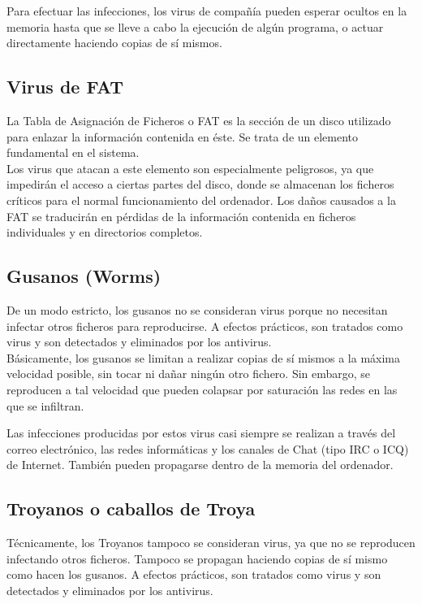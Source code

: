 \documentclass[12pt,a4paper]{article}
\begin{document}
	Para efectuar las infecciones, los virus de compañía pueden esperar ocultos en la memoria hasta que se lleve a cabo la ejecución de algún programa, o actuar directamente haciendo copias de sí mismos.
	
	\subsection{Virus de FAT}
	La Tabla de Asignación de Ficheros o FAT es la sección de un disco utilizado para enlazar la información contenida en éste. Se trata de un elemento fundamental en el sistema.\\
	
	Los virus que atacan a este elemento son especialmente peligrosos, ya que impedirán el acceso a ciertas partes del disco, donde se almacenan los ficheros críticos para el normal funcionamiento del ordenador. Los daños causados a la FAT se traducirán en pérdidas de la información contenida en ficheros individuales y en directorios completos.
	
	\subsection{Gusanos (Worms)}
	De un modo estricto, los gusanos no se consideran virus porque no necesitan infectar otros ficheros para reproducirse. A efectos prácticos, son tratados como virus y son detectados y eliminados por los antivirus.\\
	
	Básicamente, los gusanos se limitan a realizar copias de sí mismos a la máxima velocidad posible, sin tocar ni dañar ningún otro fichero. Sin embargo, se reproducen a tal velocidad que pueden colapsar por saturación las redes en las que se infiltran.
	
	Las infecciones producidas por estos virus casi siempre se realizan a través del correo electrónico, las redes informáticas y los canales de Chat (tipo IRC o ICQ) de Internet. También pueden propagarse dentro de la memoria del ordenador.
	
	\subsection{Troyanos o caballos de Troya}
	Técnicamente, los Troyanos tampoco se consideran virus, ya que no se reproducen infectando otros ficheros. Tampoco se propagan haciendo copias de sí mismo como hacen los gusanos. A efectos prácticos, son tratados como virus y son detectados y eliminados por los antivirus.\\
	
\end{document}
